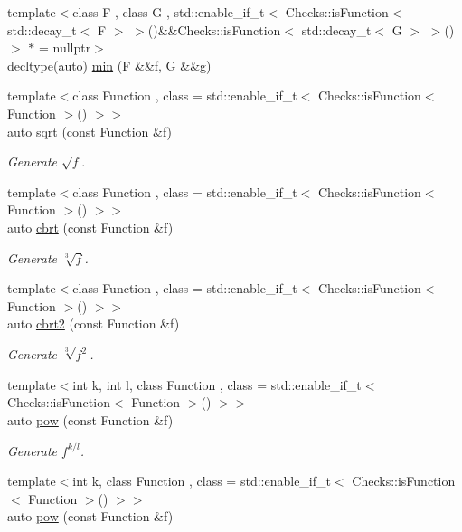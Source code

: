\begin{DoxyCompactItemize}
\item 
{\footnotesize template$<$class F , class G , std\+::enable\+\_\+if\+\_\+t$<$ Checks\+::is\+Function$<$ std\+::decay\+\_\+t$<$ F $>$ $>$()\&\&\+Checks\+::is\+Function$<$ std\+::decay\+\_\+t$<$ G $>$ $>$() $>$ $\ast$  = nullptr$>$ }\\decltype(auto) \hyperlink{group__CMathGroup_ga3f7e080cc9d1ca2b99cb4d2f41ed557c}{min} (F \&\&f, G \&\&g)
\item 
{\footnotesize template$<$class Function , class  = std\+::enable\+\_\+if\+\_\+t$<$ Checks\+::is\+Function$<$ Function $>$() $>$$>$ }\\auto \hyperlink{group__CMathGroup_ga136c890475e48f88469a737d95368d05}{sqrt} (const Function \&f)
\begin{DoxyCompactList}\small\item\em Generate $ \sqrt{f} $. \end{DoxyCompactList}\item 
{\footnotesize template$<$class Function , class  = std\+::enable\+\_\+if\+\_\+t$<$ Checks\+::is\+Function$<$ Function $>$() $>$$>$ }\\auto \hyperlink{group__CMathGroup_gaa7f2552adfb8ec41aeb685adddd8bf98}{cbrt} (const Function \&f)
\begin{DoxyCompactList}\small\item\em Generate $ \sqrt[3]{f} $. \end{DoxyCompactList}\item 
{\footnotesize template$<$class Function , class  = std\+::enable\+\_\+if\+\_\+t$<$ Checks\+::is\+Function$<$ Function $>$() $>$$>$ }\\auto \hyperlink{group__CMathGroup_gafd27322fb64c6df3366f384c93819a06}{cbrt2} (const Function \&f)
\begin{DoxyCompactList}\small\item\em Generate $ \sqrt[3]{f^2}$. \end{DoxyCompactList}\item 
{\footnotesize template$<$int k, int l, class Function , class  = std\+::enable\+\_\+if\+\_\+t$<$ Checks\+::is\+Function$<$ Function $>$() $>$$>$ }\\auto \hyperlink{group__CMathGroup_gaecae6fa60bbfc0eb1867581ee4577d4e}{pow} (const Function \&f)
\begin{DoxyCompactList}\small\item\em Generate $ f^{k/l} $. \end{DoxyCompactList}\item 
{\footnotesize template$<$int k, class Function , class  = std\+::enable\+\_\+if\+\_\+t$<$ Checks\+::is\+Function$<$ Function $>$() $>$$>$ }\\auto \hyperlink{group__CMathGroup_gab52ffe2efd379aad7ea322de46103465}{pow} (const Function \&f)

\end{DoxyCompactItemize}
